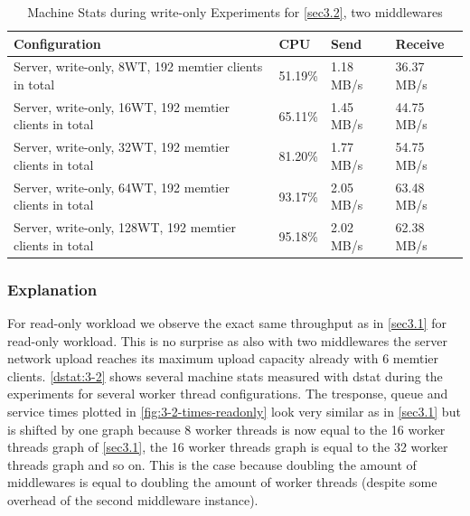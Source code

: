 \documentclass[11pt,a4paper]{article}
\begin{document}
\begin{center}
    \begin{table}
    	\begin{tabular}{|l|p{2cm}|p{2cm}|p{2cm}|}
            \hline \textbf{Configuration} & \textbf{CPU} & \textbf{Send} & \textbf{Receive}\\
            \hline Server, write-only, 8WT, 192 memtier clients in total & 51.19\%         & 1.18 MB/s    & 36.37 MB/s\\
            \hline Server, write-only, 16WT, 192 memtier clients in total & 65.11\%         & 1.45 MB/s    & 44.75 MB/s\\
            \hline Server, write-only, 32WT, 192 memtier clients in total & 81.20\%         & 1.77 MB/s    & 54.75 MB/s\\
            \hline Server, write-only, 64WT, 192 memtier clients in total & 93.17\%         & 2.05 MB/s    & 63.48 MB/s\\
            \hline Server, write-only, 128WT, 192 memtier clients in total & 95.18\%         & 2.02 MB/s    & 62.38 MB/s\\
            \hline
    	\end{tabular}
	\caption{Machine Stats during write-only Experiments for \autoref{sec3.2}, two middlewares}
    \label{dstat:3-2wo}
	\end{table}
\end{center}


\subsubsection{Explanation}
For read-only workload we observe the exact same throughput as in \autoref{sec3.1} for read-only workload. This is no surprise as also with two middlewares the server network upload reaches its maximum upload capacity already with 6 memtier clients. \autoref{dstat:3-2} shows several machine stats measured with dstat during the experiments for several worker thread configurations.
The tresponse, queue and service times plotted in \autoref{fig:3-2-times-readonly} look very similar as in \autoref{sec3.1} but is shifted by one graph because 8 worker threads is now equal to the 16 worker threads graph of \autoref{sec3.1}, the 16 worker threads graph is equal to the 32 worker threads graph and so on. This is the case because doubling the amount of middlewares is equal to doubling the amount of worker threads (despite some overhead of the second middleware instance).
\end{document}
